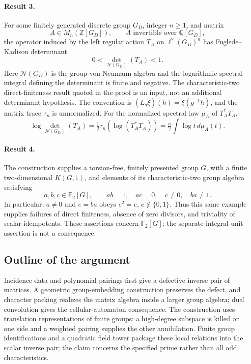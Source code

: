\documentclass[11pt]{article}
\begin{document}
\paragraph{Result 3.} For some finitely generated discrete group \(G_D\), integer \(n\ge1\), and matrix
\[
 A\in M_n(\mathbb Z[G_D]),\qquad A\text{ invertible over }\mathbb Q[G_D],
\]
the operator induced by the left regular action \(T_A\) on \(\ell^2(G_D)^n\) has Fuglede--Kadison determinant
\[
 0<\det_{\mathcal N(G_D)}(T_A)<1.
\]
Here \(\mathcal N(G_D)\) is the group von Neumann algebra and the logarithmic spectral integral defining the determinant is finite and negative. The characteristic-two direct-finiteness result quoted in the proof is an input, not an additional determinant hypothesis. The convention is $(L_g\xi)(h)=\xi(g^{-1}h)$, and the matrix trace $\tau_n$ is unnormalized. For the normalized spectral law $\mu_A$ of $T_A^*T_A$,
\[
 \log\det_{\mathcal N(G_D)}(T_A)=\tfrac12\tau_n(\log(T_A^*T_A))=\tfrac n2\int\log t\,d\mu_A(t).
\]

\paragraph{Result 4.} The construction supplies a torsion-free, finitely presented group \(G\), with a finite two-dimensional \(K(G,1)\), and elements of its characteristic-two group algebra satisfying
\[
 a,b,c\in\mathbb F_2[G],\qquad ab=1,\quad ac=0,\quad c\ne0,\quad ba\ne1.
\]
In particular, \(a\ne0\) and \(e=ba\) obeys \(e^2=e\), \(e\notin\{0,1\}\). Thus this same example supplies failures of direct finiteness, absence of zero divisors, and triviality of scalar idempotents. These assertions concern \(\mathbb F_2[G]\); the separate integral-unit assertion is not a consequence.

\subsection{Outline of the argument}
Incidence data and polynomial pairings first give a defective inverse pair of matrices. A geometric group-embedding construction preserves the defect, and character packing realizes the matrix algebra inside a larger group algebra; dual convolution gives the cellular-automaton consequence. The construction uses translation representations of finite groups: a high-degree subspace is killed on one side and a weighted pairing supplies the other annihilation. Finite group identifications and a quadratic field tower package these local relations into the scalar inverse pair; the claim concerns the specified prime rather than all odd characteristics.
\end{document}
